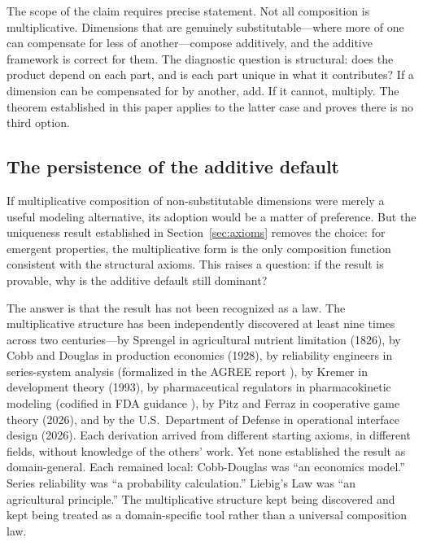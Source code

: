 \documentclass[12pt, a4paper]{article}
\theoremstyle{definition}
\theoremstyle{remark}
\begin{document}
The scope of the claim requires precise statement. Not all composition is multiplicative. Dimensions that are genuinely substitutable---where more of one can compensate for less of another---compose additively, and the additive framework is correct for them. The diagnostic question is structural: does the product depend on each part, and is each part unique in what it contributes? If a dimension can be compensated for by another, add. If it cannot, multiply. The theorem established in this paper applies to the latter case and proves there is no third option.

\subsection{The persistence of the additive default}

If multiplicative composition of non-substitutable dimensions were merely a useful modeling alternative, its adoption would be a matter of preference. But the uniqueness result established in Section~\ref{sec:axioms} removes the choice: for emergent properties, the multiplicative form is the only composition function consistent with the structural axioms. This raises a question: if the result is provable, why is the additive default still dominant?

The answer is that the result has not been recognized as a law. The multiplicative structure has been independently discovered at least nine times across two centuries---by Sprengel \cite{sprengel1826} in agricultural nutrient limitation (1826), by Cobb and Douglas \cite{cobb1928} in production economics (1928), by reliability engineers in series-system analysis (formalized in the AGREE report \cite{agree1957}), by Kremer \cite{kremer1993} in development theory (1993), by pharmaceutical regulators in pharmacokinetic modeling (codified in FDA guidance \cite{fda2003}), by Pitz and Ferraz \cite{pitz2026} in cooperative game theory (2026), and by the U.S.\ Department of Defense in operational interface design (2026). Each derivation arrived from different starting axioms, in different fields, without knowledge of the others' work. Yet none established the result as domain-general. Each remained local: Cobb-Douglas was ``an economics model.'' Series reliability was ``a probability calculation.'' Liebig's Law was ``an agricultural principle.'' The multiplicative structure kept being discovered and kept being treated as a domain-specific tool rather than a universal composition law.
\end{document}
